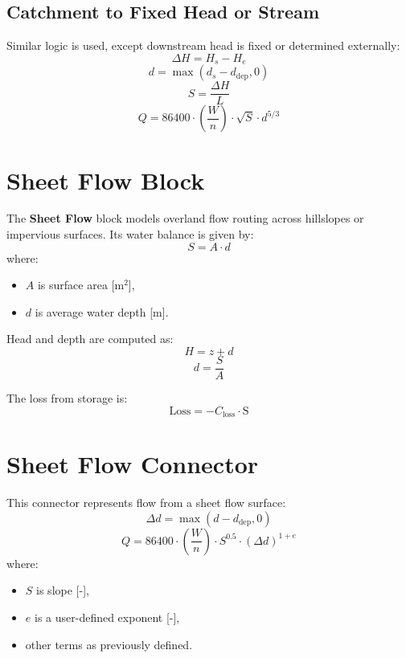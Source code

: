 \documentclass[12pt]{report}
\begin{document}
\subsection*{Catchment to Fixed Head or Stream}

Similar logic is used, except downstream head is fixed or determined externally:
\begin{equation}
\Delta H = H_s - H_e
\end{equation}
\begin{equation}
d = \max(d_s - d_{\text{dep}}, 0)
\end{equation}
\begin{equation}
S = \frac{\Delta H}{L}
\end{equation}
\begin{equation}
Q = 86400 \cdot \left(\frac{W}{n}\right) \cdot \sqrt{S} \cdot d^{5/3}
\end{equation}

\section{Sheet Flow Block}

The \textbf{Sheet Flow} block models overland flow routing across hillslopes or impervious surfaces. Its water balance is given by:
\begin{equation}
S = A \cdot d
\end{equation}
where:
\begin{itemize}
  \item $A$ is surface area [m$^2$],
  \item $d$ is average water depth [m].
\end{itemize}

Head and depth are computed as:
\begin{equation}
H = z + d
\end{equation}
\begin{equation}
d = \frac{S}{A}
\end{equation}

The loss from storage is:
\begin{equation}
\text{Loss} = -C_{\text{loss}} \cdot \text{S}
\end{equation}

\section{Sheet Flow Connector}

This connector represents flow from a sheet flow surface:
\begin{equation}
\Delta d = \max(d - d_{\text{dep}}, 0)
\end{equation}
\begin{equation}
Q = 86400 \cdot \left(\frac{W}{n}\right) \cdot S^{0.5} \cdot (\Delta d)^{1 + e}
\end{equation}
where:
\begin{itemize}
  \item $S$ is slope [-],
  \item $e$ is a user-defined exponent [-],
  \item other terms as previously defined.
\end{itemize}
\end{document}
